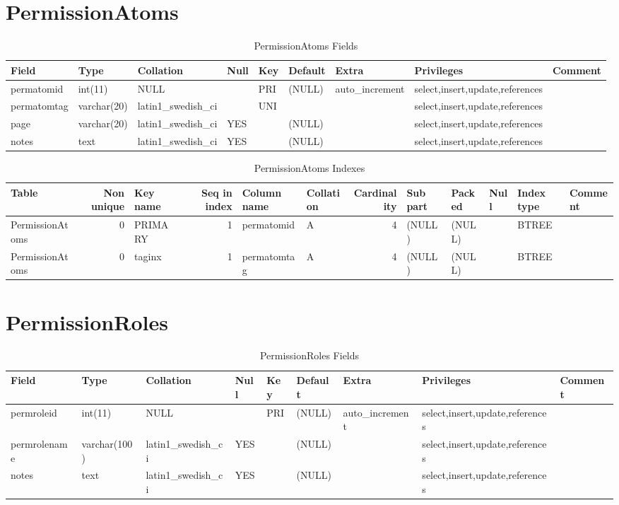 \documentclass[captions=tablesignature]{scrartcl}
\begin{document}
\section{PermissionAtoms}
\label{sec-13}

\begin{table}[htb]
\caption{\label{tbl:permissionatomsfields}PermissionAtoms Fields}
\centering
\begin{tabular}{lllllllll}
\hline
Field & Type & Collation & Null & Key & Default & Extra & Privileges & Comment\\
\hline
permatomid & int(11) & NULL &  & PRI & (NULL) & auto\_increment & select,insert,update,references & \\
permatomtag & varchar(20) & latin1\_swedish\_ci &  & UNI &  &  & select,insert,update,references & \\
page & varchar(20) & latin1\_swedish\_ci & YES &  & (NULL) &  & select,insert,update,references & \\
notes & text & latin1\_swedish\_ci & YES &  & (NULL) &  & select,insert,update,references & \\
\hline
\end{tabular}
\end{table}

\begin{table}[htb]
\caption{\label{tbl:permissionatomsindexes}PermissionAtoms Indexes}
\centering
\begin{tabular}{lrlrllrlllll}
\hline
Table & Non unique & Key name & Seq in index & Column name & Collation & Cardinality & Sub part & Packed & Null & Index type & Comment\\
\hline
PermissionAtoms & 0 & PRIMARY & 1 & permatomid & A & 4 & (NULL) & (NULL) &  & BTREE & \\
PermissionAtoms & 0 & taginx & 1 & permatomtag & A & 4 & (NULL) & (NULL) &  & BTREE & \\
\hline
\end{tabular}
\end{table}
\section{PermissionRoles}
\label{sec-14}

\begin{table}[htb]
\caption{\label{tbl:permissionrolesfields}PermissionRoles Fields}
\centering
\begin{tabular}{lllllllll}
\hline
Field & Type & Collation & Null & Key & Default & Extra & Privileges & Comment\\
\hline
permroleid & int(11) & NULL &  & PRI & (NULL) & auto\_increment & select,insert,update,references & \\
permrolename & varchar(100) & latin1\_swedish\_ci & YES &  & (NULL) &  & select,insert,update,references & \\
notes & text & latin1\_swedish\_ci & YES &  & (NULL) &  & select,insert,update,references & \\
\hline
\end{tabular}
\end{table}
\end{document}

